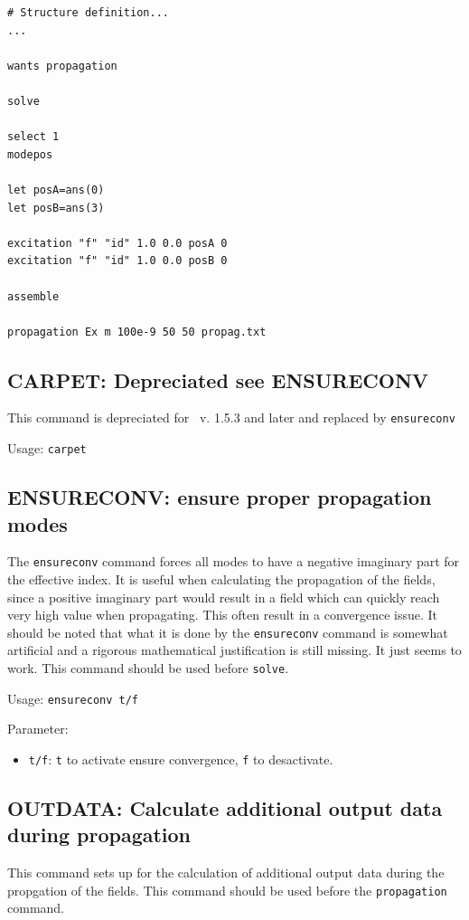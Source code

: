 \begin{itemize}
\begin{lstlisting}
# Structure definition...
...

wants propagation

solve

select 1
modepos

let posA=ans(0)
let posB=ans(3)

excitation "f" "id" 1.0 0.0 posA 0
excitation "f" "id" 1.0 0.0 posB 0

assemble 

propagation Ex m 100e-9 50 50 propag.txt
\end{lstlisting}


\end{itemize}

\subsection{CARPET: Depreciated see ENSURECONV}
\label{subsec_carpet}
This command is depreciated for \afmm\ v. 1.5.3 and later and replaced by \lstinline!ensureconv!

    Usage: \lstinline!carpet!
    
\subsection{ENSURECONV: ensure proper propagation modes}
\label{subsec_ensureconv}
The \lstinline!ensureconv! command forces all modes to have a negative imaginary part for the effective index. It is useful when calculating the propagation of the fields, since a positive imaginary part would result in a field which can quickly reach very high value when propagating. This often result in a convergence issue. It should be noted that what it is done by the \lstinline!ensureconv! command is somewhat artificial and a rigorous mathematical justification is still missing\cite{hench2008rcwa}. It just seems to work.
This command should be used before \lstinline!solve!.

    Usage: \lstinline!ensureconv t/f!
    
    Parameter:
    \begin{itemize}
    \item\lstinline!t/f!: \lstinline!t! to activate ensure convergence, \lstinline!f! to desactivate. 
    \end{itemize}
    
\subsection{OUTDATA: Calculate additional output data during propagation}
 This command sets up for the calculation of additional output data during the propgation of the fields. This command should be used before the \lstinline!propagation! command.
    
